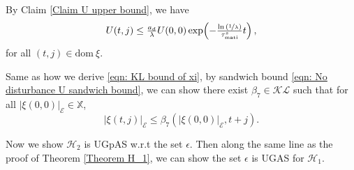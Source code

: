 By Claim \ref{Claim U upper bound}, we have 
 \begin{equation}
     U(t,j) \leq \tfrac{a_d}{\lambda}U(0,0)  \exp \!\left(-\tfrac{\ln{(\nicefrac{1}{\lambda})}}{\tau_{\text{mati}}^s}t \right),
     \label{eqn: Exponeltial U upperbound}
 \end{equation}
 for all $(t,j) \in \text{dom} \ \xi$.
 
 Same as how we derive \eqref{eqn: KL bound of xi}, by sandwich bound \eqref{eqn: No disturbance U sandwich bound}, we can show there exist $\beta_7 \in \mathcal{KL}$ such that for all $|\xi(0,0)|_\mathcal{E} \in \mathbb{X}$, 
 \begin{equation*}
     |\xi(t,j)|_\mathcal{E} \leq \beta_7(|\xi(0,0)|_\mathcal{E},t+j).
 \end{equation*}

 Now we show $\mathcal{H}_2$ is UGpAS w.r.t the set $\epsilon$. Then along the same line as the proof of Theorem \ref{Theorem H_1}, we can show the set $\epsilon$ is UGAS for $\mathcal{H}_1$. 
 






 

